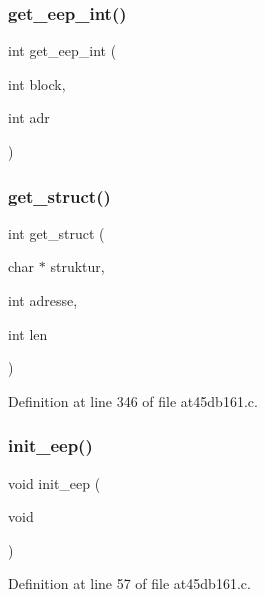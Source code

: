 \mbox{\label{at45db161_8h_af326c2e66793e0caaecc96b8acbc67fd}} 
\subsubsection{get\+\_\+eep\+\_\+int()}
{\footnotesize\ttfamily int get\+\_\+eep\+\_\+int (\begin{DoxyParamCaption}\item[{int}]{block,  }\item[{int}]{adr }\end{DoxyParamCaption})}

\mbox{\label{at45db161_8h_af8f36297b3dfaa0c729c2d7627140a9e}} 
\subsubsection{get\+\_\+struct()}
{\footnotesize\ttfamily int get\+\_\+struct (\begin{DoxyParamCaption}\item[{char $\ast$}]{struktur,  }\item[{int}]{adresse,  }\item[{int}]{len }\end{DoxyParamCaption})}



Definition at line 346 of file at45db161.\+c.

\mbox{\label{at45db161_8h_a478a6580f60a54fc5facbaf561d73f8b}} 
\subsubsection{init\+\_\+eep()}
{\footnotesize\ttfamily void init\+\_\+eep (\begin{DoxyParamCaption}\item[{void}]{ }\end{DoxyParamCaption})}



Definition at line 57 of file at45db161.\+c.

\mbox{\label{at45db161_8h_a67abee2196250891a8788506aa631db5}} 
